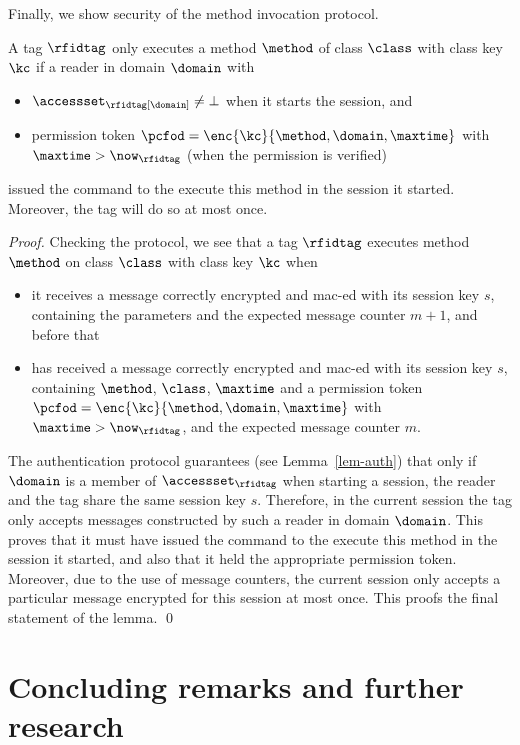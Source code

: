 Finally, we show security of the method invocation protocol.
\begin{lemma}
A tag  $\rfidtag$ only executes a method $\method$ of class $\class$ 
with class key $\kc$ if a reader in domain $\domain$ 
with
\begin{itemize}
\fixlistspacing
\item $\accessset_\rfidtag[\domain] \neq \bot$ when it starts the session, and
\item permission token $\pcfod = \enc{\kc}{\method,\domain,\maxtime}$ 
with $\maxtime > \now_\rfidtag$ (when the permission is verified)
\end{itemize}
issued the command to the execute this method in the session it started. Moreover,
the tag will do so at most once.
\end{lemma}
\begin{proof}
Checking the protocol, we see that a tag $\rfidtag$ executes method $\method$
on class $\class$ with class key $\kc$ when
\begin{itemize}
\fixlistspacing
\item it receives a message correctly encrypted and
mac-ed with its session key $s$, containing the parameters and the expected
message counter $m+1$, and before that
\item has received a message correctly encrypted and
mac-ed with its session key $s$, containing 
$\method$, $\class$, $\maxtime$ and 
a permission token $\pcfod = \enc{\kc}{\method,\domain,\maxtime}$ with
$\maxtime > \now_\rfidtag$, and the expected message counter $m$.
\end{itemize}
The authentication protocol guarantees (see Lemma~\ref{lem-auth}) that
only if $\domain$ is a member of $\accessset_\rfidtag$
when starting a session, the reader and the tag 
share the same session key $s$.
Therefore, in the current session the tag only accepts messages
constructed by such a  reader in domain $\domain$. This proves that
it must have issued the command to the execute this method in the session
it started, and also that it held the appropriate permission token.
Moreover, due to the use of message counters, the current session only accepts
a particular message encrypted for this session at most once.
This proofs the final statement of the lemma.
\qed
\end{proof}



\section{Concluding remarks and further research}
\label{sec-concl}

